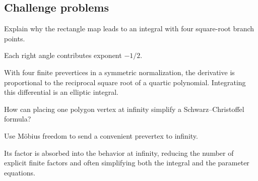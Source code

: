 \subsection*{Challenge problems}

\begin{exercise}\label{exr:iv18-expand-15}
Explain why the rectangle map leads to an integral with four square-root branch points.
\end{exercise}
\begin{hint}
Each right angle contributes exponent \(-1/2\).
\end{hint}
\begin{solution}
With four finite prevertices in a symmetric normalization, the derivative is proportional to the reciprocal square root of a quartic polynomial. Integrating this differential is an elliptic integral.
\end{solution}

\begin{exercise}\label{exr:iv18-expand-16}
How can placing one polygon vertex at infinity simplify a Schwarz--Christoffel formula?
\end{exercise}
\begin{hint}
Use Möbius freedom to send a convenient prevertex to infinity.
\end{hint}
\begin{solution}
Its factor is absorbed into the behavior at infinity, reducing the number of explicit finite factors and often simplifying both the integral and the parameter equations.
\end{solution}


